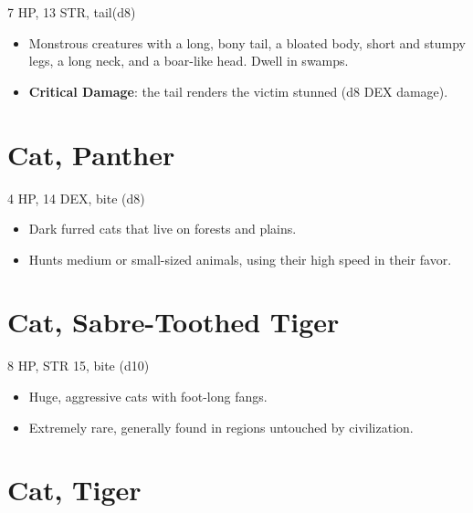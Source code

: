\documentclass[
  10pt,
  american,
]{article}
\begin{document}
7 HP, 13 STR, tail(d8)

\begin{samepage}
\begin{itemize}
\setlength\itemsep{-.5em}
\item Monstrous creatures with a long, bony tail, a bloated body, short and stumpy legs, a long neck, and a boar-like head.   Dwell in swamps.
\item \textbf{Critical Damage}: the tail renders the victim stunned (d8 DEX damage).
\end{itemize}
\end{samepage}

\hypertarget{cat-panther}{%
\section{Cat, Panther}\label{cat-panther}}

4 HP, 14 DEX, bite (d8)

\begin{samepage}
\begin{itemize}
\setlength\itemsep{-.5em}
\item Dark furred cats that live on forests and plains.
\item Hunts medium or small-sized animals, using their high speed in their favor.
\end{itemize}
\end{samepage}

\hypertarget{cat-sabre-toothed-tiger}{%
\section{Cat, Sabre-Toothed Tiger}\label{cat-sabre-toothed-tiger}}

8 HP, STR 15, bite (d10)

\begin{samepage}
\begin{itemize}
\setlength\itemsep{-.5em}
\item Huge, aggressive cats with foot-long fangs.
\item Extremely rare, generally found in regions untouched by civilization.
\end{itemize}
\end{samepage}

\hypertarget{cat-tiger}{%
\section{Cat, Tiger}\label{cat-tiger}}
\end{document}
